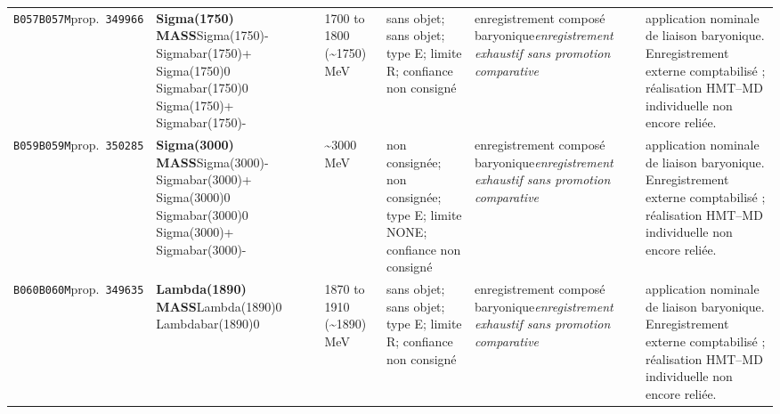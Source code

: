 \begin{landscape}
\begin{longtable}{L{1.85cm}L{4.45cm}L{2.35cm}L{4.05cm}L{3.35cm}L{7.15cm}}
\texttt{B057}\newline \texttt{B057M}\newline prop.\ \texttt{349966} & \textbf{Sigma(1750) MASS}\newline Sigma(1750)- \textbar{}\allowbreak{} Sigmabar(1750)+ \textbar{}\allowbreak{} Sigma(1750)0 \textbar{}\allowbreak{} Sigmabar(1750)0 \textbar{}\allowbreak{} Sigma(1750)+ \textbar{}\allowbreak{} Sigmabar(1750)- & 1700 to 1800 (\textasciitilde{}1750)\,MeV & sans objet; sans objet; type E; limite R; confiance non consigné & enregistrement composé baryonique\newline \emph{enregistrement exhaustif sans promotion comparative} & application nominale de liaison baryonique. Enregistrement externe comptabilisé ; réalisation HMT--MD individuelle non encore reliée. \\
\texttt{B059}\newline \texttt{B059M}\newline prop.\ \texttt{350285} & \textbf{Sigma(3000) MASS}\newline Sigma(3000)- \textbar{}\allowbreak{} Sigmabar(3000)+ \textbar{}\allowbreak{} Sigma(3000)0 \textbar{}\allowbreak{} Sigmabar(3000)0 \textbar{}\allowbreak{} Sigma(3000)+ \textbar{}\allowbreak{} Sigmabar(3000)- & \textasciitilde{}3000\,MeV & non consignée; non consignée; type E; limite NONE; confiance non consigné & enregistrement composé baryonique\newline \emph{enregistrement exhaustif sans promotion comparative} & application nominale de liaison baryonique. Enregistrement externe comptabilisé ; réalisation HMT--MD individuelle non encore reliée. \\
\texttt{B060}\newline \texttt{B060M}\newline prop.\ \texttt{349635} & \textbf{Lambda(1890) MASS}\newline Lambda(1890)0 \textbar{}\allowbreak{} Lambdabar(1890)0 & 1870 to 1910 (\textasciitilde{}1890)\,MeV & sans objet; sans objet; type E; limite R; confiance non consigné & enregistrement composé baryonique\newline \emph{enregistrement exhaustif sans promotion comparative} & application nominale de liaison baryonique. Enregistrement externe comptabilisé ; réalisation HMT--MD individuelle non encore reliée. \\

\end{longtable}
\end{landscape}
